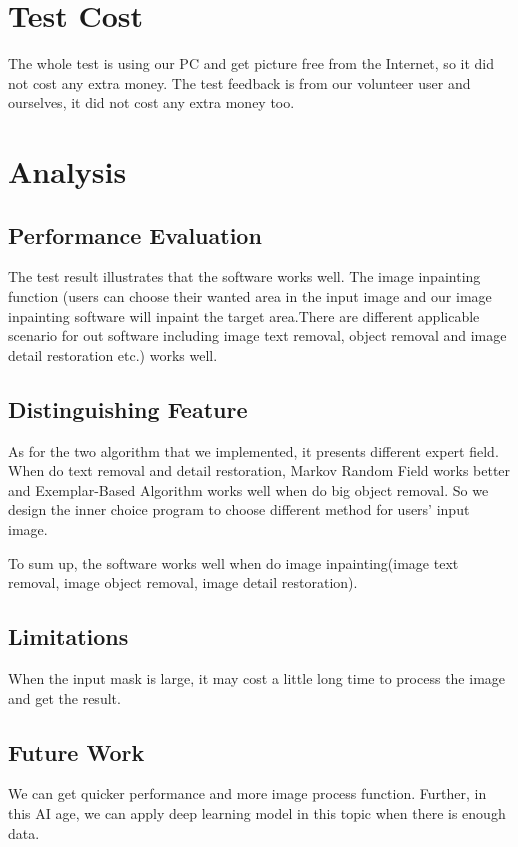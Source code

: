 \section{Test Cost}
\qquad The whole test is using our PC and get picture free from the Internet, so it did not cost any extra money. The test feedback is from our volunteer user and ourselves, it did not cost any extra money too.

\section{Analysis}
\subsection{Performance Evaluation}
\qquad The test result illustrates that the software works well. The image inpainting function (users can choose their wanted area in the input image and our image inpainting software will inpaint the target area.There are different applicable scenario for out software including image text removal, object removal and image detail restoration etc.) works well.

\subsection{Distinguishing Feature}
\qquad As for the two algorithm that we implemented, it presents different expert field. When do text removal and detail restoration, Markov Random Field works better and Exemplar-Based Algorithm works well when do big object removal. So we design the inner choice program to choose different method for users' input image. 

To sum up, the software works well when do image inpainting(image text removal, image object removal, image detail restoration).
\subsection{Limitations}
\qquad When the input mask is large, it may cost a little long time to process the image and get the result.
\subsection{Future Work}
\qquad We can get quicker performance and more image process function. Further, in this AI age, we can apply deep learning model in this topic when there is enough data.
